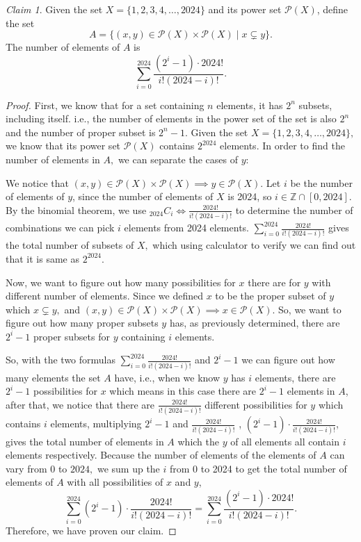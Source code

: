 \documentclass{homework}
\theoremstyle{remark}
\newtheorem*{claim}{Claim}
\newcommand{\?}{\stackrel{?}{=}}
\begin{document}
\begin{claim}
    Given the set $X=\{1,2,3,4,\ldots,2024\}$ and its power set $\mathcal{P}(X)$, define the set $$A=\{(x,y)\in\mathcal{P}(X)\times\mathcal{P}(X)\mid x\subsetneq y\}.$$ The number of elements of $A$ is $$\sum_{i=0}^{2024}\frac{(2^i-1)\cdot2024!}{i!(2024-i)!}.$$
\end{claim}
\begin{proof}
First, we know that for a set containing $n$ elements, it has $2^n$ subsets, including itself. i.e., the number of elements in the power set of the set is also $2^n$ and the number of proper subset is $2^n-1.$ Given the set $X=\{1,2,3,4,\ldots,2024\},$ we know that its power set $\mathcal{P}(X)$ contains $2^{2024}$ elements. In order to find the number of elements in $A,$ we can separate the cases of $y$:

We notice that $(x,y)\in\mathcal{P}(X)\times\mathcal{P}(X)\implies y\in\mathcal{P}(X)$. Let $i$ be the number of elements of $y$, since the number of elements of $X$ is 2024, so $i\in\mathbb{Z}\cap[0,2024]$. By the binomial theorem, we use $_{2024}C_{i} \iff \frac{2024!}{i!(2024-i)!}$ to determine the number of combinations we can pick $i$ elements from 2024 elements.  $\sum_{i=0}^{2024}\frac{2024!}{i!(2024-i)!}$ gives the total number of subsets of $X,$ which using calculator to verify we can find out that it is same as $2^{2024}.$ 

Now, we want to figure out how many possibilities for $x$ there are for $y$ with different number of elements. Since we defined $x$ to be the proper subset of $y$ which $x\subsetneq y,$ and $(x,y)\in\mathcal{P}(X)\times\mathcal{P}(X)\implies x\in\mathcal{P}(X)$. So, we want to figure out how many proper subsets $y$ has, as previously determined, there are $2^i-1$ proper subsets for $y$ containing $i$ elements. 

So, with the two formulas $\sum_{i=0}^{2024}\frac{2024!}{i!(2024-i)!}$ and $2^i-1$ we can figure out how many elements the set $A$ have, i.e., when we know $y$ has $i$ elements, there are $2^i-1$ possibilities for $x$ which means in this case there are $2^i-1$ elements in $A$, after that, we notice that there are $\frac{2024!}{i!(2024-i)!}$ different possibilities for $y$ which contains $i$ elements, multiplying $2^i-1$ and $\frac{2024!}{i!(2024-i)!}$ , $(2^i-1)\cdot\frac{2024!}{i!(2024-i)!}$, gives the total number of elements in $A$ which the $y$ of all elements all contain $i$ elements respectively. Because the number of elements of the elements of $A$ can vary from $0$ to $2024,$ we sum up the $i$ from 0 to 2024 to get the total number of elements of $A$ with all possibilities of $x$ and $y$, $$\sum_{i=0}^{2024}(2^i-1)\cdot\frac{2024!}{i!(2024-i)!} = \sum_{i=0}^{2024}\frac{(2^i-1)\cdot2024!}{i!(2024-i)!}.$$ Therefore, we have proven our claim. 
\end{proof}
\end{document}
